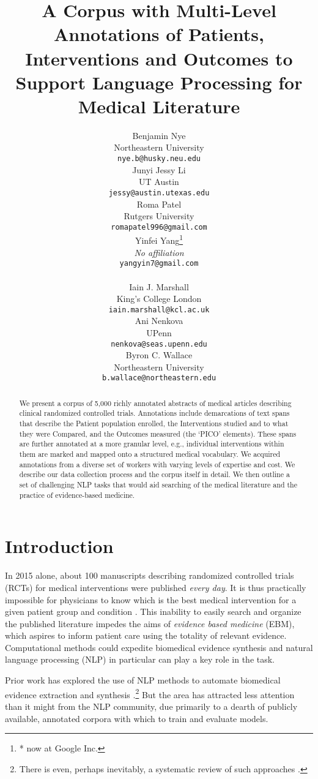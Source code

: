 \documentclass[11pt,a4paper]{article}
\title{A Corpus with Multi-Level Annotations of Patients, Interventions and Outcomes to Support Language Processing for Medical Literature}
\author{Benjamin Nye \\
  Northeastern University \\
  {\small\tt nye.b@husky.neu.edu}  \\\And 
  Junyi Jessy Li \\ 
  UT Austin \\ 
  {\small\tt jessy@austin.utexas.edu} \\\And
  Roma Patel \\
  Rutgers University\\
  {\small\tt romapatel996@gmail.com} \\\AND
  Yinfei Yang\thanks{* now at Google Inc.} \\
  \emph{No affiliation} \\
  {\small\tt yangyin7@gmail.com} \\ \\\And 
  Iain J. Marshall \\
  King's College London \\
  {\small\tt iain.marshall@kcl.ac.uk} \\\And
  Ani Nenkova \\
  UPenn \\
  {\small\tt nenkova@seas.upenn.edu} \\\AND
  Byron C. Wallace \\
  Northeastern University \\
  {\small\tt b.wallace@northeastern.edu}}
\date{}
\begin{document}
\maketitle
\begin{abstract}

We present a corpus of 5,000 richly annotated abstracts of medical articles describing clinical randomized controlled trials. Annotations include demarcations of text spans that describe the Patient population enrolled, the Interventions studied and to what they were Compared, and the Outcomes measured (the `PICO' elements). These spans are further annotated at a more granular level, e.g., individual interventions within them are marked and mapped onto a structured medical vocabulary. We acquired annotations from a diverse set of workers with varying levels of expertise and cost. We describe our data collection process and the corpus itself in detail. We then outline a set of challenging NLP tasks that would aid searching of the medical literature and the practice of evidence-based medicine. 
\end{abstract}

\section{Introduction}
\label{section:intro}
 
In 2015 alone, about 100 manuscripts describing randomized controlled trials (RCTs) for medical interventions were published \emph{every day}. It is thus practically impossible for physicians to know which is the best medical intervention for a given patient group and condition  \cite{borah2017analysis,fraser2010impossibility,bastian2010seventy}.
This inability to easily search and organize the published literature impedes the aims of \emph{evidence based medicine} (EBM), which aspires to inform patient care using the totality of relevant evidence. Computational methods could expedite biomedical evidence synthesis \cite{tsafnat2013automation,wallace2013modernizing} and natural language processing (NLP) in particular can play a key role in the task. 




Prior work has explored the use of NLP methods to automate biomedical evidence extraction and synthesis \cite{boudin2010positional,marshall:2017:ACL,ferracane2016leveraging,verbeke2012statistical}.\footnote{There is even, perhaps inevitably, a systematic review of such approaches \cite{jonnalagadda2015automating}.} But the area has attracted less attention than it might from the NLP community, due primarily to a dearth of publicly available, annotated corpora with which to train and evaluate models. 
\end{document}
